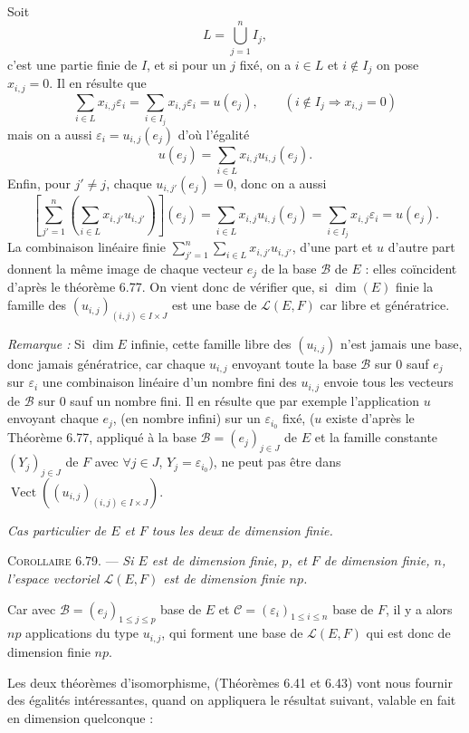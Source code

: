 Soit
\[
L=\bigcup_{j=1}^n I_j,
\]
c'est une partie finie de $I$, et si pour un $j$ fixé, on a $i\in L$ et $i\notin I_j$ on pose $x_{i,j}=0$. Il en résulte que
\[
\sum_{i\in L}x_{i,j}\varepsilon_i
=
\sum_{i\in I_j}x_{i,j}\varepsilon_i
=u(e_j),
\qquad(i\notin I_j\Rightarrow x_{i,j}=0)
\]
mais on a aussi $\varepsilon_i=u_{i,j}(e_j)$ d'où l'égalité
\[
u(e_j)=\sum_{i\in L}x_{i,j}u_{i,j}(e_j).
\]
Enfin, pour $j'\ne j$, chaque $u_{i,j'}(e_j)=0$, donc on a aussi
\[
\left[\sum_{j'=1}^n\left(\sum_{i\in L}x_{i,j'}u_{i,j'}\right)\right](e_j)
=
\sum_{i\in L}x_{i,j}u_{i,j}(e_j)
=
\sum_{i\in I_j}x_{i,j}\varepsilon_i
=u(e_j).
\]
La combinaison linéaire finie $\sum_{j'=1}^n\sum_{i\in L}x_{i,j'}u_{i,j'}$, d'une part et $u$ d'autre part donnent la même image de chaque vecteur $e_j$ de la base $\mathcal B$ de $E$ : elles coïncident d'après le théorème 6.77. On vient donc de vérifier que, si $\dim(E)$ finie la famille des $(u_{i,j})_{(i,j)\in I\times J}$ est une base de $\mathcal L(E,F)$ car libre et génératrice. \bookend

\emph{Remarque :} Si $\dim E$ infinie, cette famille libre des $(u_{i,j})$ n'est jamais une base, donc jamais génératrice, car chaque $u_{i,j}$ envoyant toute la base $\mathcal B$ sur 0 sauf $e_j$ sur $\varepsilon_i$ une combinaison linéaire d'un nombre fini des $u_{i,j}$ envoie tous les vecteurs de $\mathcal B$ sur 0 sauf un nombre fini. Il en résulte que par exemple l'application $u$ envoyant chaque $e_j$, (en nombre infini) sur un $\varepsilon_{i_0}$ fixé, ($u$ existe d'après le Théorème 6.77, appliqué à la base $\mathcal B=(e_j)_{j\in J}$ de $E$ et la famille constante $(Y_j)_{j\in J}$ de $F$ avec $\forall j\in J$, $Y_j=\varepsilon_{i_0}$), ne peut pas être dans $\operatorname{Vect}((u_{i,j})_{(i,j)\in I\times J})$.

\emph{Cas particulier de $E$ et $F$ tous les deux de dimension finie.}

\medskip\noindent\textsc{Corollaire 6.79.} --- \emph{Si $E$ est de dimension finie, $p$, et $F$ de dimension finie, $n$, l'espace vectoriel $\mathcal L(E,F)$ est de dimension finie $np$.}

Car avec $\mathcal B=(e_j)_{1\le j\le p}$ base de $E$ et $\mathcal C=(\varepsilon_i)_{1\le i\le n}$ base de $F$, il y a alors $np$ applications du type $u_{i,j}$, qui forment une base de $\mathcal L(E,F)$ qui est donc de dimension finie $np$. \bookend

Les deux théorèmes d'isomorphisme, (Théorèmes 6.41 et 6.43) vont nous fournir des égalités intéressantes, quand on appliquera le résultat suivant, valable en fait en dimension quelconque :

